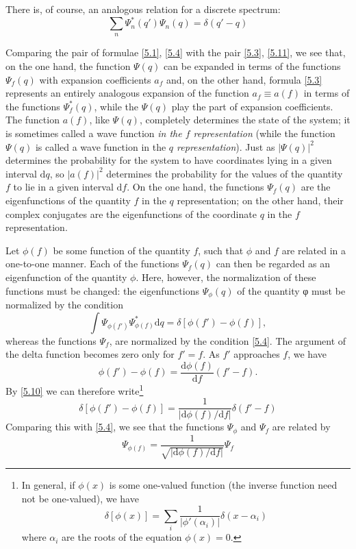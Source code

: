 There is, of course, an analogous relation for a discrete spectrum:
\begin{equation}\label{5.12}
\sum_{n}\Psi_n^*(q')\Psi_n(q)=\delta(q'-q)
\end{equation}	

Comparing the pair of formulae \eqref{5.1}, \eqref{5.4} with the pair \eqref{5.3}, \eqref{5.11}, we see that, on the one hand, the function $ \Psi(q) $ can be expanded in terms of the functions$  \Psi_f(q) $ with expansion coefficients $ a_f $ and, on the other hand, formula \eqref{5.3} represents an entirely analogous expansion of the function $ a_f \equiv a (f) $ in terms of the functions $  \Psi_f^*(q) $, while the $ \Psi(q) $ play the part of expansion coefficients. The function $ a (f) $, like $ \Psi(q) $, completely determines the state of the system; it is sometimes called a wave function \textit{in the $ f $ representation} (while the function $ \Psi(q) $ is called a wave function in the \textit{$ q $ representation}). Just as $ |\Psi(q)|^2 $ determines the probability for the system to have coordinates lying in a given interval $ \mathrm{d}q $, so $ |a(f)|^2 $ determines the probability for the values of the quantity $ f $ to lie in a given interval $ \mathrm{d}f $. On the one hand, the functions $ \Psi_f(q) $ are the eigenfunctions of the quantity $ f $ in the $ q $ representation; on the other hand, their complex conjugates are the eigenfunctions of the coordinate $ q $ in the $ f $ representation.
	
Let $ \phi(f) $ be some function of the quantity $ f $, such that $ \phi $ and $ f $ are related in a one-to-one manner. Each of the functions $ \Psi_f(q) $ can then be regarded as an eigenfunction of the quantity $ \phi $. Here, however, the normalization of these functions must be changed: the eigenfunctions $ \Psi_\phi(q) $ of the quantity φ must be normalized by the condition
\[ \int\Psi_{\phi(f')}\Psi_{\phi(f)}^*\mathrm{d}q=\delta\left[ \phi(f')-\phi(f)\right],\]	
whereas the functions $ \Psi_f $, are normalized by the condition \eqref{5.4}. The argument of the delta function becomes zero only for $ f' = f $. As $ f' $ approaches $ f $, we have 
\[ \phi(f')-\phi(f) =\frac{\mathrm{d}\phi(f)}{\mathrm{d}f}(f'-f). \]
By \eqref{5.10} we can therefore write\footnote{In general, if $ \phi(x) $ is some one-valued function (the inverse function need not be one-valued), we have
\begin{equation*}\label{5.13a}
\delta\left[\phi(x)\right]=\sum_{i}\frac{1}{|\phi'(\alpha_i)|}\delta(x-\alpha_i)\tag{5.13a}
\end{equation*}	
where $ \alpha_i $ are the roots of the equation $ \phi(x) = 0 $.
}
\begin{equation}\label{5.13}
\delta\left[\phi(f')-\phi(f) \right]=\frac{1}{|\mathrm{d}\phi(f)/\mathrm{d}f|}\delta(f'-f)
\end{equation}	
Comparing this with \eqref{5.4}, we see that the functions $ \Psi_\phi $ and $ \Psi_f $ are related by
\begin{equation}\label{5.14}
\Psi_{\phi(f)}=\frac{1}{\sqrt{|\mathrm{d}\phi(f)/\mathrm{d}f|}}\Psi_f
\end{equation}	

